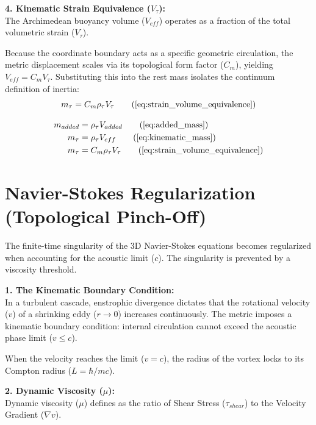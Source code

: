 \textbf{4. Kinematic Strain Equivalence ($V_\tau$):} \\
The Archimedean buoyancy volume ($V_{eff}$) operates as a fraction of the total volumetric strain ($V_\tau$).  

Because the coordinate boundary acts as a specific geometric circulation, the metric displacement scales via its topological form factor ($C_m$), yielding $V_{eff} = C_m V_\tau$. Substituting this into the rest mass isolates the continuum definition of inertia: 
\begin{equation}
    m_\tau = C_m  \rho_\tau V_\tau \tag{\ref{eq:strain_volume_equivalence}}
\end{equation}

\begin{tcolorbox}[recallbox, title={\ref{box:hydrodynamic_mass}. The Kinematic Origin of Inertia}]
\begin{align}
    m_{added} &= \rho_{\tau} V_{added} \tag{\ref{eq:added_mass}} \\
    m_\tau &= \rho_{\tau} V_{eff} \tag{\ref{eq:kinematic_mass}} \\
    m_\tau &= C_m \rho_\tau V_\tau \tag{\ref{eq:strain_volume_equivalence}}
\end{align}
\end{tcolorbox}


\section{Navier-Stokes Regularization (Topological Pinch-Off)}
\label{sec:deriv_ns_reg}

The finite-time singularity of the 3D Navier-Stokes equations becomes regularized when accounting for the acoustic limit ($c$). The singularity is prevented by a viscosity threshold. 

\textbf{1. The Kinematic Boundary Condition:} \\
In a turbulent cascade, enstrophic divergence dictates that the rotational velocity ($v$) of a shrinking eddy ($r \to 0$) increases continuously. The metric imposes a kinematic boundary condition: internal circulation cannot exceed the acoustic phase limit ($v \le c$). 

When the velocity reaches the limit ($v = c$), the radius of the vortex locks to its Compton radius ($L = \hbar / m c$). 

\textbf{2. Dynamic Viscosity ($\mu$):} \\
Dynamic viscosity ($\mu$) defines as the ratio of Shear Stress ($\tau_{shear}$) to the Velocity Gradient ($\nabla v$).

